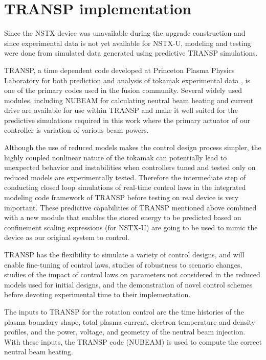 \documentclass[12pt,lot, lof]{puthesis}
\begin{document}
\section{TRANSP implementation}

Since the NSTX device was unavailable during the upgrade construction and since experimental data is not yet available for NSTX-U, modeling and testing were done from simulated data generated using predictive TRANSP simulations.

TRANSP, a time dependent code developed at Princeton Plasma Physics Laboratory for both prediction and analysis of tokamak experimental data \cite{TRANSP16, Budny94}, is one of the primary codes used in the fusion community. Several widely used modules, including NUBEAM \cite{Pankin04} for calculating neutral beam heating and current drive are available for use within TRANSP and make it well suited for the predictive simulations required in this work where the primary actuator of our controller is variation of various beam powers.

Although the use of reduced models makes the control design process simpler, the highly coupled nonlinear nature of the tokamak can potentially lead to unexpected behavior and instabilities when controllers tuned and tested only on reduced models are experimentally tested. Therefore the intermediate step of conducting closed loop simulations of real-time control laws in the integrated modeling code framework of TRANSP before testing on real device is very important.
These predictive capabilities of TRANSP mentioned above combined with a new module that enables the stored energy to be predicted based on confinement scaling expressions (for \mbox{NSTX-U}) are going to be used to mimic the device as our original system to control. 

TRANSP has the flexibility to simulate a variety of control designs, and will enable fine-tuning of control laws, studies of robustness to scenario changes, studies of the impact of control laws on parameters not considered in the reduced models used for initial designs, and the demonstration of novel control schemes before devoting experimental time to their implementation.

The inputs to TRANSP for the rotation control are the time histories of the plasma boundary shape, total plasma current, electron temperature and density profiles, and the power, voltage, and geometry of the neutral beam injection. With these inputs, the TRANSP code (NUBEAM) is used to compute the correct neutral beam heating.
\end{document}
